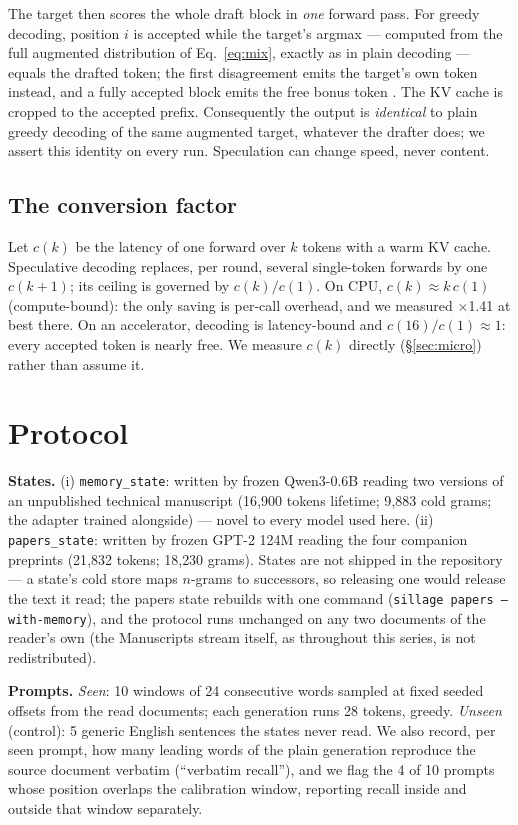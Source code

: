 \documentclass[11pt]{article}
\begin{document}
The target then scores the whole draft block in \emph{one} forward pass. For greedy decoding, position $i$ is accepted while the target's argmax --- computed from the full augmented distribution of Eq.~\eqref{eq:mix}, exactly as in plain decoding --- equals the drafted token; the first disagreement emits the target's own token instead, and a fully accepted block emits the free bonus token \cite{leviathan}. The KV cache is cropped to the accepted prefix. Consequently the output is \emph{identical} to plain greedy decoding of the same augmented target, whatever the drafter does; we assert this identity on every run. Speculation can change speed, never content.

\subsection{The conversion factor}\label{sec:micromethod}

Let $c(k)$ be the latency of one forward over $k$ tokens with a warm KV cache. Speculative decoding replaces, per round, several single-token forwards by one $c(k{+}1)$; its ceiling is governed by $c(k)/c(1)$. On CPU, $c(k) \approx k\,c(1)$ (compute-bound): the only saving is per-call overhead, and we measured $\times$1.41 at best there. On an accelerator, decoding is latency-bound and $c(16)/c(1) \approx 1$: every accepted token is nearly free. We measure $c(k)$ directly (\S\ref{sec:micro}) rather than assume it.

\section{Protocol}\label{sec:protocol}

\textbf{States.} (i) \texttt{memory\_state}: written by frozen Qwen3-0.6B reading two versions of an unpublished technical manuscript (16{,}900 tokens lifetime; 9{,}883 cold grams; the adapter trained alongside) --- novel to every model used here. (ii) \texttt{papers\_state}: written by frozen GPT-2 124M reading the four companion preprints (21{,}832 tokens; 18{,}230 grams). States are not shipped in the repository --- a state's cold store maps $n$-grams to successors, so releasing one would release the text it read; the papers state rebuilds with one command (\texttt{sillage papers --with-memory}), and the protocol runs unchanged on any two documents of the reader's own (the Manuscripts stream itself, as throughout this series, is not redistributed).

\textbf{Prompts.} \emph{Seen}: 10 windows of 24 consecutive words sampled at fixed seeded offsets from the read documents; each generation runs 28 tokens, greedy. \emph{Unseen} (control): 5 generic English sentences the states never read. We also record, per seen prompt, how many leading words of the plain generation reproduce the source document verbatim (``verbatim recall''), and we flag the 4 of 10 prompts whose position overlaps the calibration window, reporting recall inside and outside that window separately.
\end{document}
